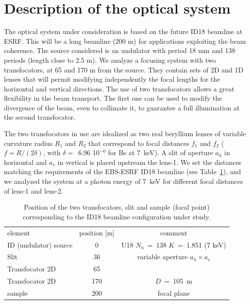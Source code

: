 \documentclass{iucr}              %
\begin{document}
\section{Description of the optical system}
\label{sec:beamline}


The optical system under consideration is based on the future ID18 beamline at ESRF. This will be a long beamline (200 m) for applications exploiting the beam coherence. The source considered is an undulator with period 18 mm and 138 periods (length close to 2.5 m).  
We analyze a focusing system with two transfocators, at 65 and 170 m from the source. They contain sets of 2D and 1D lenses that will permit modifying independently the focal lengths for the horizontal and vertical directions. The use of two transfocators allows a great flexibility in the beam transport. The first one can be used to modify the divergence of the beam, even to collimate it, to guarantee a full illumination at the second transfocator.  

The two transfocators in use are idealized as two real beryllium lenses of variable curvature radius $R_1$ and $R_2$ that correspond to focal distances $f_1$ and $f_2$ ($f=R/(2 \delta)$, with $\delta=$~6.96 10$^{-6}$ for Be at \SI{7}{keV}). A slit of aperture $a_h$ in horizontal and $a_v$ in vertical is placed upstream the lens-1. We set the distances matching the requirements of the EBS-ESRF ID18 beamline (see Table~\ref{table:id18parameters}), and we analyzed the system at a photon energy of \SI{7}{keV} for different focal distances of lens-1 and lens-2. 


\begin{table}[]
    \label{table:id18parameters}
    \caption{Position of the two transfocators, slit and sample (focal point) corresponding to the ID18 beamline configuration under study. }
    \centering
    \begin{tabular}{l|c|c}
         element & position [m] & comment\\
         ID (undulator) source& 0 & U18 $N_u$~=~138 $K$~=~1.851 (7 keV)\\
         Slit & 36 &
         variable aperture $a_h\times a_v$
         \\
         Transfocator 2D & 65 & 
         \\
         Transfocator 2D & 170 & $D$~=~\SI{105}{\meter} \\
         sample & 200 & focal plane
    \end{tabular}
\end{table}
\end{document}
